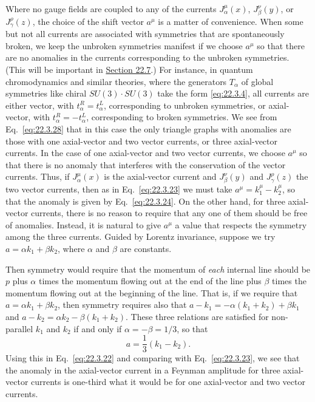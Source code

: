 Where no gauge fields are coupled to any of the currents
$J_\alpha^\mu(x)$, $J_\beta^\nu(y)$, or $J_\gamma^\rho(z)$, the choice of
the shift vector $a^\mu$ is a matter of convenience. When some but not all
currents are associated with symmetries that are spontaneously broken, we
keep the unbroken symmetries manifest if we choose $a^\mu$ so that there
are no anomalies in the currents corresponding to the unbroken symmetries.
(This will be important in \hyperref[sec:22.7]{Section 22.7}.) For instance,
in quantum chromodynamics and similar theories, where the generators
$T_\alpha$ of global symmetries like chiral $SU(3)\cdot SU(3)$ take the
form \eqref{eq:22.3.4}, all currents are either vector, with
$t_\alpha^R=t_\alpha^L$, corresponding to unbroken symmetries, or
axial-vector, with $t_\alpha^R=-t_\alpha^L$, corresponding to broken
symmetries. We see from Eq.~\eqref{eq:22.3.28} that in this case the only
triangle graphs with anomalies are those with one axial-vector and two
vector currents, or three axial-vector currents. In the case of one
axial-vector and two vector currents, we choose $a^\mu$ so that there is no
anomaly that interferes with the conservation of the vector currents. Thus,
if $J_\alpha^\mu(x)$ is the axial-vector current and $J_\beta^\nu(y)$ and
$J_\gamma^\rho(z)$ the two vector currents, then as in
Eq.~\eqref{eq:22.3.23} we must take $a^\mu=k_1^\mu-k_2^\mu$, so that the
anomaly is given by Eq.~\eqref{eq:22.3.24}. On the other hand, for three
axial-vector currents, there is no reason to require that any one of them
should be free of anomalies. Instead, it is natural to give $a^\mu$ a value
that respects the symmetry among the three currents. Guided by Lorentz
invariance, suppose we try $a=\alpha k_1+\beta k_2$, where $\alpha$ and
$\beta$ are constants.

Then symmetry would require that the momentum of \emph{each} internal line
should be $p$ plus $\alpha$ times the momentum flowing out at the end of the
line plus $\beta$ times the momentum flowing out at the beginning of the
line. That is, if we require that $a=\alpha k_1+\beta k_2$, then symmetry
requires also that
$a-k_1=-\alpha(k_1+k_2)+\beta k_1$ and
$a-k_2=\alpha k_2-\beta(k_1+k_2)$. These three relations are satisfied for
non-parallel $k_1$ and $k_2$ if and only if
$\alpha=-\beta=1/3$, so that
\begin{equation}
 a=\frac13(k_1-k_2).
 \tag{22.3.30}\label{eq:22.3.30}
\end{equation}
Using this in Eq.~\eqref{eq:22.3.22} and comparing with
Eq.~\eqref{eq:22.3.23}, we see that the anomaly in the axial-vector current
in a Feynman amplitude for three axial-vector currents is one-third what it
would be for one axial-vector and two vector currents.

